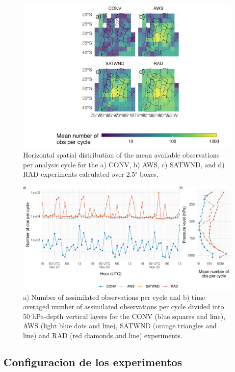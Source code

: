 \documentclass[12pt,twoside]{reedthesis}
\begin{document}
\begin{figure}
\includegraphics[width=1\linewidth]{thesis_files/figure-latex/obs-horizontal-1} \caption{Horizontal spatial distribution of the mean available observations per analysis cycle for the a) CONV, b) AWS, c) SATWND, and d) RAD experiments calculated over 2.5\(^{\circ}\) boxes.}\label{fig:obs-horizontal}
\end{figure}

\begin{figure}
\centering
\includegraphics{thesis_files/figure-latex/obs-cycle-1.pdf}
\caption{\label{fig:obs-cycle}a) Number of assimilated observations per cycle and b) time averaged number of assimilated observations per cycle divided into 50 hPa-depth vertical layers for the CONV (blue squares and line), AWS (light blue dots and line), SATWND (orange triangles and line) and RAD (red diamonds and line) experiments.}
\end{figure}
\hypertarget{configuracion-de-los-experimentos}{%
\subsection{Configuracion de los experimentos}\label{configuracion-de-los-experimentos}}
\end{document}
